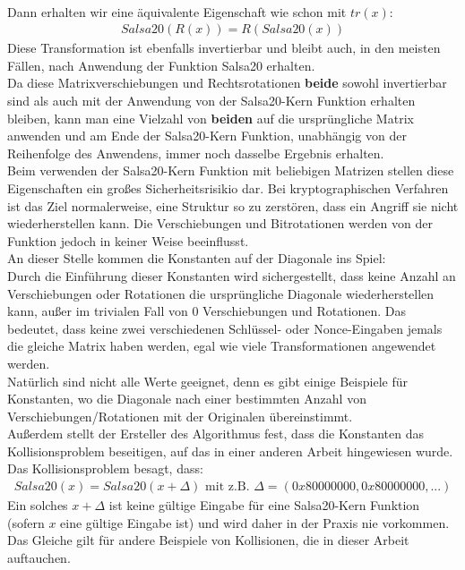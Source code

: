 \documentclass[course=erap]{aspdoc}
\begin{document}
\vspace{1mm}
\\Dann erhalten wir eine äquivalente Eigenschaft wie schon mit $tr(x)$:
\begin{gather*}
    Salsa20(R(x)) = R(Salsa20(x))
\end{gather*}
Diese Transformation ist ebenfalls invertierbar und bleibt auch, in den meisten Fällen, nach Anwendung der Funktion Salsa20 erhalten.\cite{salsa20security}
\vspace{1mm}
\\Da diese Matrixverschiebungen und Rechtsrotationen \textbf{beide} sowohl invertierbar sind als auch mit der Anwendung von der Salsa20-Kern Funktion erhalten bleiben,
kann man eine Vielzahl von \textbf{beiden} auf die ursprüngliche Matrix anwenden und am Ende der Salsa20-Kern Funktion, unabhängig von der Reihenfolge des Anwendens, immer noch dasselbe Ergebnis erhalten.
\vspace{1mm}
\\Beim verwenden der Salsa20-Kern Funktion mit beliebigen Matrizen stellen diese Eigenschaften ein großes Sicherheitsrisikio dar.
Bei kryptographischen Verfahren ist das Ziel normalerweise, eine Struktur so zu zerstören, dass ein Angriff sie nicht wiederherstellen kann.
Die Verschiebungen und Bitrotationen werden von der Funktion jedoch in keiner Weise beeinflusst.
\vspace{1mm}
\\An dieser Stelle kommen die Konstanten auf der Diagonale ins Spiel:
\vspace{2mm}
\\Durch die Einführung dieser Konstanten wird sichergestellt, dass keine Anzahl an Verschiebungen oder Rotationen die ursprüngliche Diagonale wiederherstellen kann,
außer im trivialen Fall von 0 Verschiebungen und Rotationen. Das bedeutet, dass keine zwei verschiedenen Schlüssel- oder Nonce-Eingaben
jemals die gleiche Matrix haben werden, egal wie viele Transformationen angewendet werden.\cite{salsa20security}
\vspace{1mm}
\\Natürlich sind nicht alle Werte geeignet, denn es gibt einige Beispiele für Konstanten,
wo die Diagonale nach einer bestimmten Anzahl von Verschiebungen/Rotationen mit der Originalen übereinstimmt.
\vspace{1mm}
\\Außerdem stellt der Ersteller des Algorithmus fest\cite{ResponseOnTheSalsa20Core}, dass die Konstanten das Kollisionsproblem beseitigen,
auf das in einer anderen Arbeit\cite{onTheSalsa20Core} hingewiesen wurde.\\
Das Kollisionsproblem besagt, dass:
\begin{gather*} Salsa20(x) = Salsa20(x + \Delta) \text{  mit z.B.  } \Delta=(0x80000000,0x80000000,...) \end{gather*}
Ein solches $x+\Delta$ ist keine gültige Eingabe für eine Salsa20-Kern Funktion (sofern $x$ eine gültige Eingabe ist) und wird daher in der Praxis nie vorkommen.
Das Gleiche gilt für andere Beispiele von Kollisionen, die in dieser Arbeit auftauchen.
\end{document}
